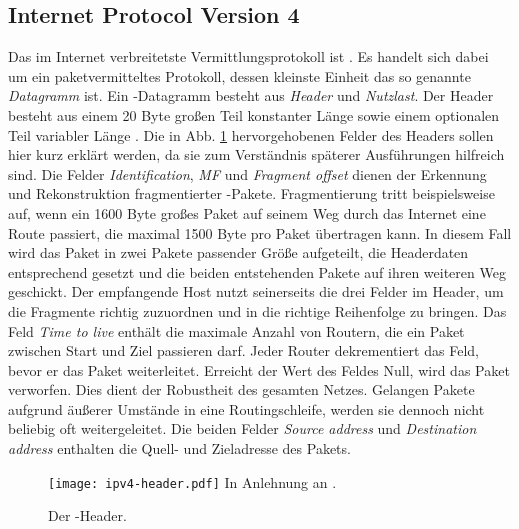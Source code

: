 \subsection{Internet Protocol Version 4}
Das im Internet verbreitetste Vermittlungsprotokoll ist . Es handelt sich dabei um ein paketvermitteltes Protokoll, dessen kleinste Einheit das so genannte \textit{Datagramm} ist. Ein -Datagramm besteht aus \textit{Header} und \textit{Nutzlast}. Der Header besteht aus einem 20 Byte großen Teil konstanter Länge sowie einem optionalen Teil variabler Länge \autocite[439]{Tanenbaum2010}. Die in Abb. \ref{grafik:ipv4-header} hervorgehobenen Felder des Headers sollen hier kurz erklärt werden, da sie zum Verständnis späterer Ausführungen hilfreich sind.
Die Felder \textit{Identification}, \textit{MF} und \textit{Fragment offset} dienen der Erkennung und Rekonstruktion fragmentierter -Pakete. Fragmentierung tritt beispielsweise auf, wenn ein 1600 Byte großes Paket auf seinem Weg durch das Internet eine Route passiert, die maximal 1500 Byte pro Paket übertragen kann. In diesem Fall wird das Paket in zwei Pakete passender Größe aufgeteilt, die Headerdaten entsprechend gesetzt und die beiden entstehenden Pakete auf ihren weiteren Weg geschickt. Der empfangende Host nutzt seinerseits die drei Felder im Header, um die Fragmente richtig zuzuordnen und in die richtige Reihenfolge zu bringen. Das Feld \textit{Time to live} enthält die maximale Anzahl von Routern, die ein Paket zwischen Start und Ziel passieren darf. Jeder Router dekrementiert das Feld, bevor er das Paket weiterleitet. Erreicht der Wert des Feldes Null, wird das Paket verworfen. Dies dient der Robustheit des gesamten Netzes. Gelangen Pakete aufgrund äußerer Umstände in eine Routingschleife, werden sie dennoch nicht beliebig oft weitergeleitet. Die beiden Felder \textit{Source address} und \textit{Destination address} enthalten die Quell- und Zieladresse des Pakets.
\begin{figure}[tp]
    \centering
    \texttt{[image: ipv4-header.pdf]}\linebreak
    In Anlehnung an \textcite[439]{Tanenbaum2010}.
    \caption{Der -Header.}
    \label{grafik:ipv4-header}
\end{figure}
